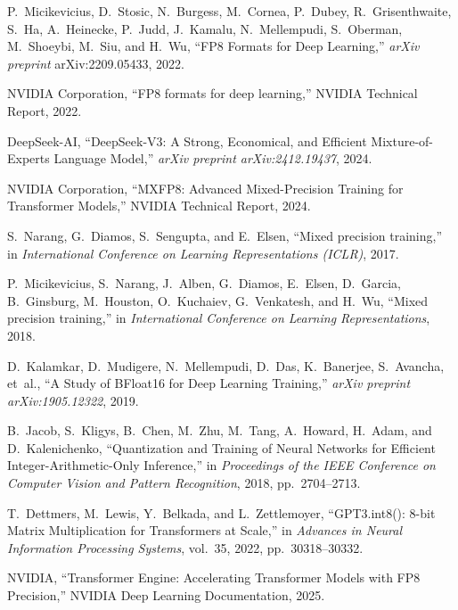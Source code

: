 \documentclass[conference]{IEEEtran}
\begin{document}
\begin{thebibliography}{40}

P.~Micikevicius, D.~Stosic, N.~Burgess, M.~Cornea, P.~Dubey, R.~Grisenthwaite, 
S.~Ha, A.~Heinecke, P.~Judd, J.~Kamalu, N.~Mellempudi, S.~Oberman, 
M.~Shoeybi, M.~Siu, and H.~Wu, 
``FP8 Formats for Deep Learning,'' 
\emph{arXiv preprint} arXiv:2209.05433, 2022.

NVIDIA Corporation,
``FP8 formats for deep learning,''
NVIDIA Technical Report, 2022.

DeepSeek-AI,
``DeepSeek-V3: A Strong, Economical, and Efficient Mixture-of-Experts Language Model,''
\emph{arXiv preprint arXiv:2412.19437}, 2024.

NVIDIA Corporation,
``MXFP8: Advanced Mixed-Precision Training for Transformer Models,''
NVIDIA Technical Report, 2024.

S.~Narang, G.~Diamos, S.~Sengupta, and E.~Elsen,
``Mixed precision training,''
in \emph{International Conference on Learning Representations (ICLR)}, 2017.

P.~Micikevicius, S.~Narang, J.~Alben, G.~Diamos, E.~Elsen, D.~Garcia, B.~Ginsburg, M.~Houston, O.~Kuchaiev, G.~Venkatesh, and H.~Wu,
``Mixed precision training,''
in \emph{International Conference on Learning Representations}, 2018.

D.~Kalamkar, D.~Mudigere, N.~Mellempudi, D.~Das, K.~Banerjee, S.~Avancha, et~al.,
``A Study of BFloat16 for Deep Learning Training,''
\emph{arXiv preprint arXiv:1905.12322}, 2019.

B.~Jacob, S.~Kligys, B.~Chen, M.~Zhu, M.~Tang, A.~Howard, H.~Adam, and D.~Kalenichenko,
``Quantization and Training of Neural Networks for Efficient Integer-Arithmetic-Only Inference,''
in \emph{Proceedings of the IEEE Conference on Computer Vision and Pattern Recognition}, 2018, pp.~2704--2713.

T.~Dettmers, M.~Lewis, Y.~Belkada, and L.~Zettlemoyer,
``GPT3.int8(): 8-bit Matrix Multiplication for Transformers at Scale,''
in \emph{Advances in Neural Information Processing Systems}, vol.~35, 2022, pp.~30318--30332.

NVIDIA,
``Transformer Engine: Accelerating Transformer Models with FP8 Precision,''
NVIDIA Deep Learning Documentation, 2025.


\end{thebibliography}
\end{document}
